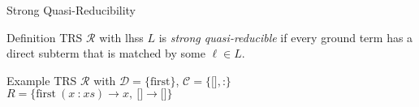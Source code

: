 \begin{frame}{Strong Quasi-Reducibility}
\begin{block}{Definition}
    TRS $\mathcal{R}$ with lhss $L$ is \textit{strong quasi-reducible} if every ground term has a direct subterm that is matched by some $\ell \in L$.
\end{block}

\begin{block}{Example}
    TRS $\mathcal{R}$ with $\mathcal{D} = \{\text{first}\}$, $\mathcal{C} = \{\texttt{[]}, \texttt{:}\}$ \\
    $R = \{\text{first}\ (x\ \texttt{:}\ xs) \to x,\ \texttt{[]} \to \texttt{[]}\}$
\end{block}

\end{frame}

